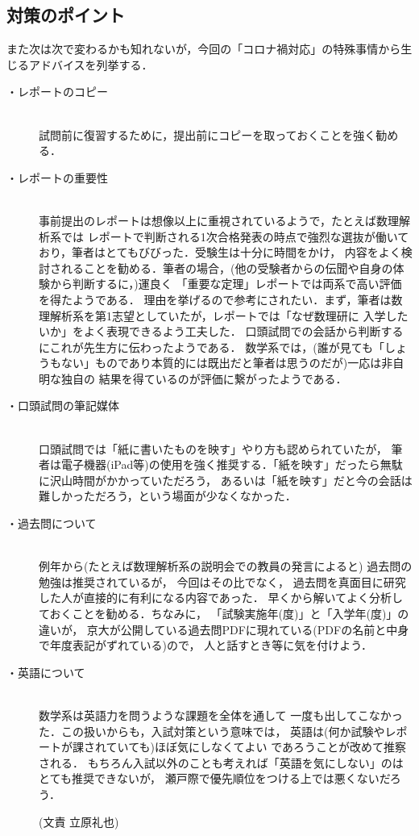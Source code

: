 \documentclass[uplatex]{jsarticle}
\begin{document}
\subsection*{対策のポイント}
また次は次で変わるかも知れないが，今回の「コロナ禍対応」の特殊事情から生じるアドバイスを列挙する．
\begin{description}
	\item[・レポートのコピー]\mbox{}\\ 試問前に復習するために，提出前にコピーを取っておくことを強く勧める．
	
	\item[・レポートの重要性]\mbox{}\\ 事前提出のレポートは想像以上に重視されているようで，たとえば数理解析系では
	レポートで判断される1次合格発表の時点で強烈な選抜が働いており，筆者はとてもびびった．受験生は十分に時間をかけ，
	内容をよく検討されることを勧める．筆者の場合，(他の受験者からの伝聞や自身の体験から判断するに，)運良く
	「重要な定理」レポートでは両系で高い評価を得たようである．
	理由を挙げるので参考にされたい．まず，筆者は数理解析系を第1志望としていたが，レポートでは「なぜ数理研に
	入学したいか」をよく表現できるよう工夫した．
  口頭試問での会話から判断するにこれが先生方に伝わったようである．
	数学系では，(誰が見ても「しょうもない」ものであり本質的には既出だと筆者は思うのだが)一応は非自明な独自の
	結果を得ているのが評価に繋がったようである．
	
	\item[・口頭試問の筆記媒体]\mbox{}\\ 口頭試問では「紙に書いたものを映す」やり方も認められていたが，
  筆者は電子機器(iPad等)の使用を強く推奨する．「紙を映す」だったら無駄に沢山時間がかかっていただろう，
	あるいは「紙を映す」だと今の会話は難しかっただろう，という場面が少なくなかった．
	
	\item[・過去問について]\mbox{}\\ 例年から(たとえば数理解析系の説明会での教員の発言によると)
  過去問の勉強は推奨されているが，
  今回はその比でなく，
  過去問を真面目に研究した人が直接的に有利になる内容であった．
  早くから解いてよく分析しておくことを勧める．ちなみに，
  「試験実施年(度)」と「入学年(度)」の違いが，
  京大が公開している過去問PDFに現れている(PDFの名前と中身で年度表記がずれている)ので，
	人と話すとき等に気を付けよう．
	\newpage %
	\item[・英語について]\mbox{}\\ 数学系は英語力を問うような課題を全体を通して
  一度も出してこなかった．この扱いからも，入試対策という意味では，
  英語は(何か試験やレポートが課されていても)ほぼ気にしなくてよい
  であろうことが改めて推察される．
  もちろん入試以外のことも考えれば「英語を気にしない」のはとても推奨できないが，
	瀬戸際で優先順位をつける上では悪くないだろう．
\begin{flushright}
	(文責 立原礼也)
\end{flushright}
\end{description}
\end{document}
